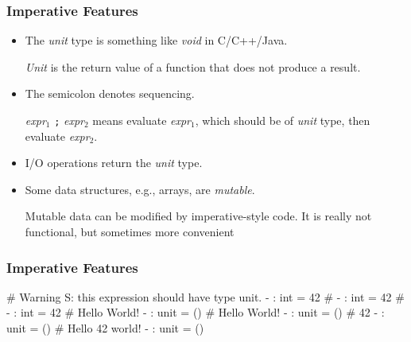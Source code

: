 \documentclass{plt}
\begin{document}
\begin{frame}[fragile]
  \frametitle{Imperative Features}

\begin{itemize}

\item The \emph{unit} type is something like \emph{void} in C/C++/Java.

\emph{Unit} is the return value of a function that does not produce a result.

\item The semicolon denotes sequencing.

\emph{expr}$_1$ \texttt{;}
  \emph{expr}$_2$ means evaluate \emph{expr}$_1$, which should be of
  \emph{unit} type, then evaluate \emph{expr}$_2$.

\item I/O operations return the \emph{unit} type.

\item Some data structures, e.g., arrays, are \emph{mutable}.

Mutable data can be modified by imperative-style code.  It is really
not functional, but sometimes more convenient
\end{itemize}

\end{frame}

\fi


\begin{frame}[fragile]
  \frametitle{Imperative Features}

\begin{interactive}
# 
Warning S: this expression should have type unit.
- : int = 42
# 
- : int = 42
# 
- : int = 42
# 
Hello World!
- : unit = ()
# 
Hello World!
- : unit = ()
# 
42
- : unit = ()
# 
Hello 42 world!
- : unit = ()
\end{interactive}

\end{frame}
\end{document}
